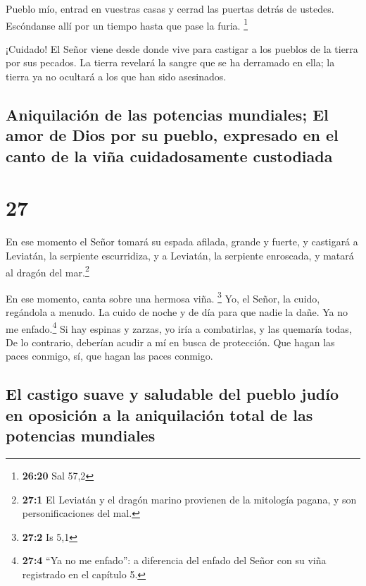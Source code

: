  Pueblo mío, entrad en vuestras casas y cerrad las
puertas detrás de ustedes. Escóndanse allí por un tiempo hasta que pase
la furia. \footnote{\textbf{26:20} Sal 57,2}

 ¡Cuidado! El Señor viene desde donde vive para castigar
a los pueblos de la tierra por sus pecados. La tierra revelará la sangre
que se ha derramado en ella; la tierra ya no ocultará a los que han sido
asesinados.

\hypertarget{aniquilaciuxf3n-de-las-potencias-mundiales-el-amor-de-dios-por-su-pueblo-expresado-en-el-canto-de-la-viuxf1a-cuidadosamente-custodiada}{%
\subsection{Aniquilación de las potencias mundiales; El amor de Dios por
su pueblo, expresado en el canto de la viña cuidadosamente
custodiada}\label{aniquilaciuxf3n-de-las-potencias-mundiales-el-amor-de-dios-por-su-pueblo-expresado-en-el-canto-de-la-viuxf1a-cuidadosamente-custodiada}}

\hypertarget{section-26}{%
\section{27}\label{section-26}}

 En ese momento el Señor tomará su espada afilada, grande
y fuerte, y castigará a Leviatán, la serpiente escurridiza, y a
Leviatán, la serpiente enroscada, y matará al dragón del mar.\footnote{\textbf{27:1}
  El Leviatán y el dragón marino provienen de la mitología pagana, y son
  personificaciones del mal.}

 En ese momento, canta sobre una hermosa viña. \footnote{\textbf{27:2}
  Is 5,1}  Yo, el Señor, la cuido, regándola a menudo. La
cuido de noche y de día para que nadie la dañe.  Ya no me
enfado.\footnote{\textbf{27:4} ``Ya no me enfado'': a diferencia del
  enfado del Señor con su viña registrado en el capítulo 5.} Si hay
espinas y zarzas, yo iría a combatirlas, y las quemaría todas,
 De lo contrario, deberían acudir a mí en busca de
protección. Que hagan las paces conmigo, sí, que hagan las paces
conmigo.

\hypertarget{el-castigo-suave-y-saludable-del-pueblo-juduxedo-en-oposiciuxf3n-a-la-aniquilaciuxf3n-total-de-las-potencias-mundiales}{%
\subsection{El castigo suave y saludable del pueblo judío en oposición a
la aniquilación total de las potencias
mundiales}\label{el-castigo-suave-y-saludable-del-pueblo-juduxedo-en-oposiciuxf3n-a-la-aniquilaciuxf3n-total-de-las-potencias-mundiales}}

